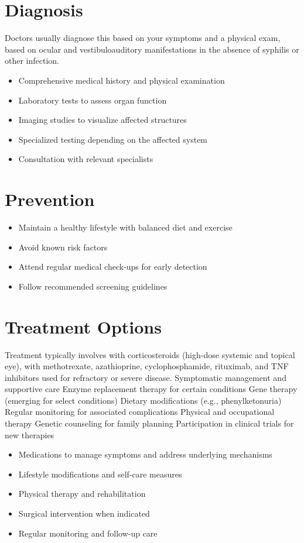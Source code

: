 \section{Diagnosis}
Doctors usually diagnose this based on your symptoms and a physical exam, based on ocular and vestibuloauditory manifestations in the absence of syphilis or other infection.

\begin{itemize}[noitemsep]
  \item Comprehensive medical history and physical examination
  \item Laboratory tests to assess organ function
  \item Imaging studies to visualize affected structures
  \item Specialized testing depending on the affected system
  \item Consultation with relevant specialists
\end{itemize}
\section{Prevention}
\begin{itemize}[noitemsep]
  \item Maintain a healthy lifestyle with balanced diet and exercise
  \item Avoid known risk factors
  \item Attend regular medical check-ups for early detection
  \item Follow recommended screening guidelines
\end{itemize}
\section{Treatment Options}
Treatment typically involves with corticosteroids (high-dose systemic and topical eye), with methotrexate, azathioprine, cyclophosphamide, rituximab, and TNF inhibitors used for refractory or severe disease. Symptomatic management and supportive care Enzyme replacement therapy for certain conditions Gene therapy (emerging for select conditions) Dietary modifications (e.g., phenylketonuria) Regular monitoring for associated complications Physical and occupational therapy Genetic counseling for family planning Participation in clinical trials for new therapies

\begin{itemize}[noitemsep]
  \item Medications to manage symptoms and address underlying mechanisms
  \item Lifestyle modifications and self-care measures
  \item Physical therapy and rehabilitation
  \item Surgical intervention when indicated
  \item Regular monitoring and follow-up care
\end{itemize}
